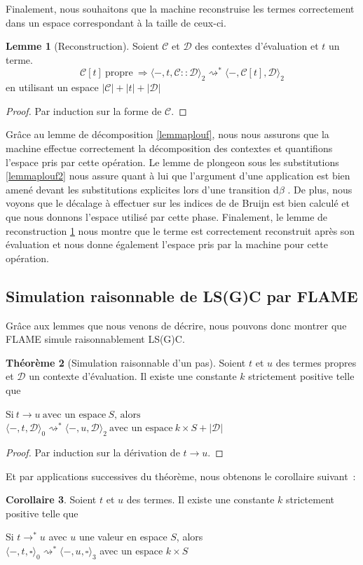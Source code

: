 \documentclass[a4paper, 11pt]{article}
\theoremstyle{definition}
\newtheorem{theorem}{Théorème}[section]
\newtheorem{lemma}[theorem]{Lemme}
\newtheorem{corollary}[theorem]{Corollaire}
\newcommand{\etat}[1]{\langle #1 \rangle}
\newcommand{\etatz}[1]{\langle #1 \rangle_0}
\newcommand{\etatt}[1]{\langle #1 \rangle_3}
\newcommand{\mcc}{\mathcal{C}}
\newcommand{\mcd}{\mathcal{D}}
\newcommand{\ra}{\rightarrow}
\newcommand{\rsa}{\rightsquigarrow}
\begin{document}
Finalement, nous souhaitons que la machine reconstruise les termes correctement dans un espace correspondant à la taille de ceux-ci.
\begin{lemma}[Reconstruction]
  \label{lemmaportugal}
  Soient $\mathcal{C}$ et $\mathcal{D}$ des contextes d'évaluation et $t$ un terme.
  \[\mathcal{C}[t]~\text{propre}~\Rightarrow \langle-,t,\mathcal{C}::\mathcal{D}\rangle_2 \rightsquigarrow^* \langle-,\mathcal{C}[t],\mathcal{D}\rangle_2\]
en utilisant un espace $|\mcc|+|t|+|\mcd|$
\end{lemma}
\begin{proof}
  Par induction sur la forme de $\mathcal{C}$.
\end{proof}
Grâce au lemme de décomposition \ref{lemmaplouf}, nous nous assurons que la machine effectue correctement la décomposition des contextes et quantifions l'espace pris par cette opération.
Le lemme de plongeon sous les substitutions \ref{lemmaplouf2} nous assure quant à lui que l'argument d'une application est bien amené devant les substitutions explicites lors d'une \og transition d$\beta$ \fg.
De plus, nous voyons que le décalage à effectuer sur les indices de de Bruijn est bien calculé et que nous donnons l'espace utilisé par cette phase.
Finalement, le lemme de reconstruction \ref{lemmaportugal} nous montre que le terme est correctement reconstruit après son évaluation et nous donne également l'espace pris par la machine pour cette opération.

\subsection{Simulation raisonnable de LS(G)C par FLAME}
Grâce aux lemmes que nous venons de décrire, nous pouvons donc montrer que FLAME simule raisonnablement LS(G)C.
\begin{theorem}[Simulation raisonnable d'un pas]
  \label{thm:simres}
  Soient $t$ et $u$ des termes propres et $\mcd$ un contexte d'évaluation.
  Il existe une constante $k$ strictement positive telle que
  \begin{center}  
    $\text{Si}~t \rightarrow u~\text{avec un espace}~S\text{, alors}$\\  
  $\etat{-,t,\mcd}_0 \rightsquigarrow^* \etat{-,u,\mcd}_2~\text{avec un espace}~k\times S+|\mcd|$
  \end{center}
\end{theorem}
\begin{proof}
  Par induction sur la dérivation de $t\rightarrow u$.
\end{proof}
Et par applications successives du théorème, nous obtenons le corollaire suivant~:
\begin{corollary}
  \label{cor:lsgcflame}
  Soient $t$ et $u$ des termes. Il existe une constante $k$ strictement positive telle que
  \begin{center}
    Si $t \ra^* u$ avec $u$ une valeur en espace $S$, alors\\
    $\etatz{-,t,\square} \rsa^* \etatt{-,u,\square}$ avec un espace $k\times S$
  \end{center}
\end{corollary}
\end{document}
